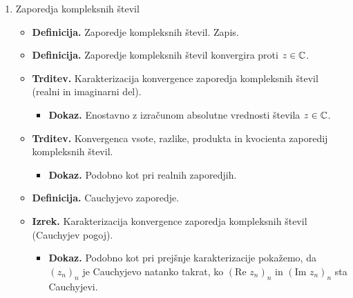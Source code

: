 \begin{enumerate}
    \item Zaporedja kompleksnih števil
    \begin{itemize}
        \item \colorbox{purple!30}{\textbf{Definicija.}} Zaporedje kompleksnih števil. Zapis.
        \item \colorbox{purple!30}{\textbf{Definicija.}} Zaporedje kompleksnih števil konvergira proti $z \in \mathbb{C}$.
        \item \colorbox{blue!30}{\textbf{Trditev.}}  Karakterizacija konvergence zaporedja kompleksnih števil (realni in imaginarni del).
        \begin{itemize}
            \item \colorbox{green!30}{\textbf{Dokaz.}} Enostavno z izračunom absolutne vrednosti števila $z \in \mathbb{C}$.
        \end{itemize} 
        \item  \colorbox{blue!30}{\textbf{Trditev.}}  Konvergenca vsote, razlike, produkta in kvocienta zaporedij kompleksnih števil.
        \begin{itemize}
            \item \colorbox{green!30}{\textbf{Dokaz.}} Podobno kot pri realnih zaporedjih.
        \end{itemize} 
        \item \colorbox{purple!30}{\textbf{Definicija.}} Cauchyjevo zaporedje.
        \item \colorbox{blue!30}{\textbf{Izrek.}} Karakterizacija konvergence zaporedja kompleksnih števil (Cauchyjev pogoj).
        \begin{itemize}
            \item \colorbox{green!30}{\textbf{Dokaz.}} Podobno kot pri prejšnje karakterizacije pokažemo, da $(z_n)_n$ je Cauchyjevo natanko takrat, ko $(\text{Re } z_n)_n$ in $(\text{Im } z_n)_n$ sta Cauchyjevi.
        \end{itemize} 
    \end{itemize}
\end{enumerate}

\newpage
\